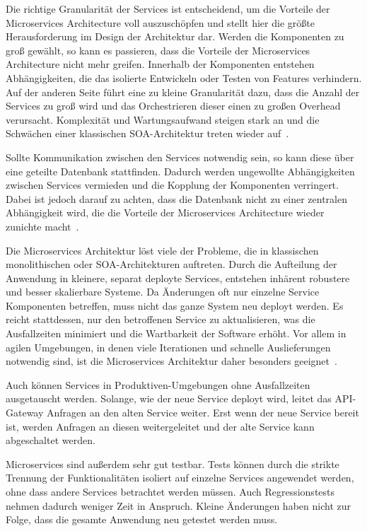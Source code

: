 \documentclass[acmtog]{acmart}
\begin{document}
Die richtige Granularität der Services ist entscheidend, um die Vorteile der Microservices Architecture voll auszuschöpfen und stellt hier die größte Herausforderung im Design der Architektur dar.
Werden die Komponenten zu groß gewählt, so kann es passieren, dass die Vorteile der Microservices Architecture nicht mehr greifen.
Innerhalb der Komponenten entstehen Abhängigkeiten, die das isolierte Entwickeln oder Testen von Features verhindern.
Auf der anderen Seite führt eine zu kleine Granularität dazu, dass die Anzahl der Services zu groß wird und das Orchestrieren dieser einen zu großen Overhead verursacht.
Komplexität und Wartungsaufwand steigen stark an und die Schwächen einer klassischen SOA-Architektur treten wieder auf~\cite[32]{architecturePatterns}.

Sollte Kommunikation zwischen den Services notwendig sein, so kann diese über eine geteilte Datenbank stattfinden.
Dadurch werden ungewollte Abhängigkeiten zwischen Services vermieden und die Kopplung der Komponenten verringert.
Dabei ist jedoch darauf zu achten, dass die Datenbank nicht zu einer zentralen Abhängigkeit wird, die die Vorteile der Microservices Architecture wieder zunichte macht~\cite[33]{architecturePatterns}.


Die Microservices Architektur löst viele der Probleme, die in klassischen monolithischen oder SOA-Architekturen auftreten.
Durch die Aufteilung der Anwendung in kleinere, separat deployte Services, entstehen inhärent robustere und besser skalierbare Systeme.
Da Änderungen oft nur einzelne Service Komponenten betreffen, muss nicht das ganze System neu deployt werden.
Es reicht stattdessen, nur den betroffenen Service zu aktualisieren, was die Ausfallzeiten minimiert und die Wartbarkeit der Software erhöht.
Vor allem in agilen Umgebungen, in denen viele Iterationen und schnelle Auslieferungen notwendig sind, ist die Microservices Architektur daher besonders geeignet~\cite[33]{architecturePatterns}.

Auch können Services in Produktiven-Umgebungen ohne Ausfallzeiten ausgetauscht werden.
Solange, wie der neue Service deployt wird, leitet das API-Gateway Anfragen an den alten Service weiter.
Erst wenn der neue Service bereit ist, werden Anfragen an diesen weitergeleitet und der alte Service kann abgeschaltet werden.

Microservices sind außerdem sehr gut testbar.
Tests können durch die strikte Trennung der Funktionalitäten isoliert auf einzelne Services angewendet werden, ohne dass andere Services betrachtet werden müssen.
Auch Regressionstests nehmen dadurch weniger Zeit in Anspruch.
Kleine Änderungen haben nicht zur Folge, dass die gesamte Anwendung neu getestet werden muss.
\end{document}
